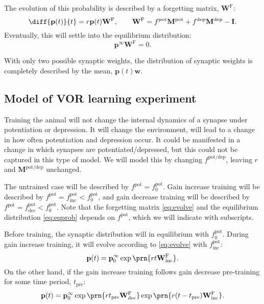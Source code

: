 \documentclass[12pt]{article}
\newcommand{\I}{\mathbf{I}}
\newcommand{\pr}{\mathbf{p}}
\newcommand{\eq}{\pr^\infty}
\newcommand{\w}{\mathbf{w}}
\newcommand{\W}{\mathbf{W}}
\newcommand{\frg}{\W^\mathrm{F}}
\newcommand{\M}{\mathbf{M}}
\newcommand{\pot}{^{\text{pot}}}
\newcommand{\dep}{^{\text{dep}}}
\newcommand{\potdep}{^{\text{pot/dep}}}
\newcommand{\norm}{_0}
\newcommand{\inc}{_{\text{inc}}}
\newcommand{\dec}{_{\text{dec}}}
\newcommand{\tpre}{t_{\text{pre}}}
\begin{document}
The evolution of this probability is described by a forgetting matrix, $\frg$:
%
\begin{equation}\label{eq:evolve}
  \diff{\pr(t)}{t} = r\pr(t)\frg,
  \qquad
  \frg = f\pot\M\pot+f\dep\M\dep-\I.
\end{equation}
%
Eventually, this will settle into the equilibrium distribution:
%
\begin{equation}\label{eq:eqprob}
  \eq\frg=0.
\end{equation}
%



With only two possible synaptic weights, the distribution of synaptic weights is completely described by the mean, $\pr(t)\w$.


\subsection{Model of VOR learning experiment}\label{sec:learning}

Training the animal will not change the internal dynamics of a synapse under potentiation or depression.
It will change the environment, will lead to a change in how often potentiation and depression occur.
It could be manifested in a change in which synapses are potentiated/depressed, but this could not be captured in this type of model.
We will model this by changing $f\potdep$, leaving $r$ and $\M\potdep$ unchanged.

The untrained case will be described by $f\pot=f\pot\norm$.
Gain increase training  will be described by $f\pot=f\pot\inc<f\pot\norm$, and
gain decrease training  will be described by $f\pot=f\pot\dec<f\pot\norm$. Note that the forgetting matrix \eqref{eq:evolve} and the equilibrium distribution \eqref{eq:eqprob} depends on $f\pot$, which we will indicate with subscripts.

Before training, the synaptic distribution will in equilibrium with $f\pot\norm$.
During gain increase training, it will evolve according to \eqref{eq:evolve} with $f\pot\inc$:
%
\begin{equation}\label{eq:nopre}
  \pr(t) = \eq\norm \exp\prn{rt\frg\inc}.
\end{equation}
%
On the other hand, if the gain increase training follows gain decrease pre-training for some time period, $\tpre$:
%
\begin{equation}\label{eq:withpre}
  \pr(t) = \eq\norm \exp\prn{r\tpre\frg\dec} \exp\prn{r(t-\tpre)\frg\inc}.
\end{equation}
%
\end{document}
